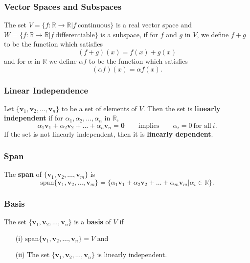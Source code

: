 \documentclass{beamer}
\begin{document}
\begin{frame}
\frametitle{Vector Spaces and Subspaces}
\begin{Example}
The set $V = \{f:\mathbb{R}\to\mathbb{R}| f\ \text{continuous}\}$ is a real vector space and $W = \{f:\mathbb{R}\to\mathbb{R}| f\ \text{differentiable}\}$ is a subspace, if for $f$ and $g$ in $V$, we define $f + g$ to be the function which satisfies 
$$
(f + g)(x) = f(x) + g(x)
$$
and for $\alpha$ in $\mathbb{R}$ we define $\alpha f$ to be the function which satisfies 
$$
(\alpha f)(x) = \alpha f(x).
$$
\end{Example}
\end{frame}

\begin{frame}
\frametitle{Linear Independence}
\begin{Definition}
Let $\{{\boldsymbol v_1}, {\boldsymbol v_2},\ldots, {\boldsymbol v_n}\}$ to be a set of elements of $V$. Then the set is {\bf linearly independent} if for $\alpha_1, \alpha_2,\ldots, \alpha_n$ in $\mathbb{R}$, 
$$
\alpha_1 {\boldsymbol v_1} + \alpha_2 {\boldsymbol v_2}+\ldots + \alpha_n {\boldsymbol v_n} = {\boldsymbol 0} \qquad\text{implies}\qquad \alpha_i = 0\ \text{for all}\ i.
$$
If the set is not linearly independent, then it is {\bf linearly dependent}. 
\end{Definition}

\end{frame}

\begin{frame}
\frametitle{Span}
\begin{Definition}
The {\bf span} of $\{{\boldsymbol v_1}, {\boldsymbol v_2},\ldots, {\boldsymbol v_m}\}$ is 
$$
\text{span}\{{\boldsymbol v_1}, {\boldsymbol v_2},\ldots, {\boldsymbol v_m}\} = \{\alpha_1{\boldsymbol v_1} + \alpha_2{\boldsymbol v_2} + \ldots + \alpha_m {\boldsymbol v_m} | \alpha_i\in\mathbb{R}\}.
$$
\end{Definition}
\end{frame}

\begin{frame}
\frametitle{Basis}
\begin{Definition}
The set $\{{\boldsymbol v_1}, {\boldsymbol v_2},\ldots, {\boldsymbol v_n}\}$ is a {\bf basis} of $V$ if
\begin{enumerate}
\item[(i)] $\text{span}\{{\boldsymbol v_1}, {\boldsymbol v_2},\ldots, {\boldsymbol v_n}\} = V$ and
\item[(ii)] The set $\{{\boldsymbol v_1}, {\boldsymbol v_2},\ldots, {\boldsymbol v_n}\}$ is linearly independent.
\end{enumerate}
\end{Definition}
\end{frame}
\end{document}
